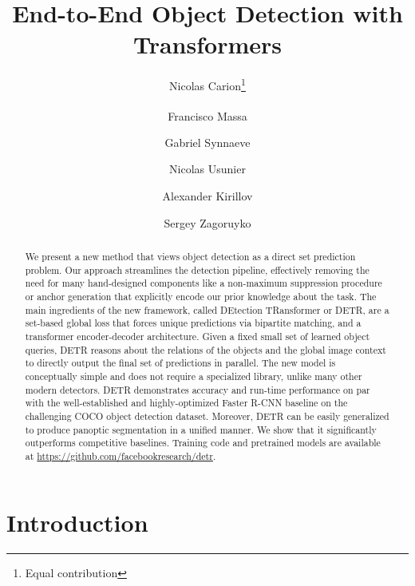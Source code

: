 \documentclass[runningheads]{llncs}
\makeatletter
\newcommand{\detr}{DETR\xspace}
\newcommand{\printfnsymbol}[1]{%
  \textsuperscript{\@fnsymbol{#1}}%
}
\makeatother
\begin{document}
\pagestyle{headings}
\mainmatter

\title{End-to-End Object Detection with Transformers}

\author{
Nicolas Carion\thanks{Equal contribution} \and Francisco Massa\printfnsymbol{1}  \and Gabriel Synnaeve \and Nicolas Usunier \and Alexander Kirillov \and Sergey Zagoruyko}

\maketitle

\begin{abstract}
	We present a new method that views object detection as a direct set prediction problem. Our approach streamlines the detection pipeline, effectively removing the need for many hand-designed components like a non-maximum suppression procedure or anchor generation that explicitly encode our prior knowledge about the task. The main ingredients of the new framework, called DEtection TRansformer or \detr, are a set-based global loss that forces unique predictions
	 via bipartite matching, %
	 and a transformer encoder-decoder architecture. Given a fixed small set of learned object queries, \detr reasons about the relations of the objects and the global image context to directly output the final set of predictions in parallel. 
	The new model is conceptually simple and does not require a specialized library, unlike many other modern detectors.
	\detr %
	demonstrates accuracy and run-time performance on par with the
  well-established and highly-optimized Faster R-CNN baseline on the challenging
  COCO object detection dataset. 
  Moreover, \detr can be easily generalized to produce panoptic segmentation in a unified manner. We show that it significantly outperforms competitive baselines.
  Training code and pretrained models are available at \url{https://github.com/facebookresearch/detr}.
  







\end{abstract}

\section{Introduction}
\end{document}
